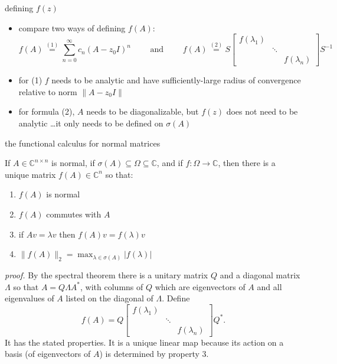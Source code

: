 \documentclass[10pt,hyperref]{beamer}
\newcommand{\CC}{\mathbb{C}}
\begin{document}
\begin{frame}{defining $f(z)$}

\begin{itemize}
\item compare two ways of defining $f(A)$:
\small
   $$f(A) \stackrel{(1)}{=} \sum_{n=0}^\infty c_n (A-z_0 I)^n \qquad \text{ and } \qquad f(A) \stackrel{(2)}{=} S \begin{bmatrix} f(\lambda_1) & & \\ & \ddots & \\ & & f(\lambda_n) \end{bmatrix} S^{-1}$$
\normalsize
\item for (1) $f$ needs to be analytic and have sufficiently-large radius of convergence relative to norm $\|A-z_0I\|$
\item for formula (2), $A$ needs to be diagonalizable, but $f(z)$ does not need to be analytic \dots it only needs to be defined on $\sigma(A)$
\end{itemize}
\end{frame}


\begin{frame}{the functional calculus for normal matrices}

\begin{theorem}
If $A\in \CC^{n\times n}$ is normal, if $\sigma(A) \subseteq \Omega \subseteq \CC$, and if $f:\Omega \to \CC$, then there is a unique matrix $f(A)\in\CC^n$ so that:
\begin{enumerate}
\item $f(A)$ is normal
\item $f(A)$ commutes with $A$
\item if $Av=\lambda v$ then $f(A)v=f(\lambda)v$
\item $\|f(A)\|_2 = \max_{\lambda\in\sigma(A)} |f(\lambda)|$
\end{enumerate}
\end{theorem}

\emph{proof.}  By the spectral theorem there is a unitary matrix $Q$ and a diagonal matrix $\Lambda$ so that $A=Q\Lambda A^*$, with columns of $Q$ which are eigenvectors of $A$ and all eigenvalues of $A$ listed on the diagonal of $\Lambda$.  Define
    $$f(A) = Q \begin{bmatrix} f(\lambda_1) & & \\ & \ddots & \\ & & f(\lambda_n) \end{bmatrix} Q^*.$$
It has the stated properties.  It is a unique linear map because its action on a basis (of eigenvectors of $A$) is determined by property 3.
\end{frame}
\end{document}
